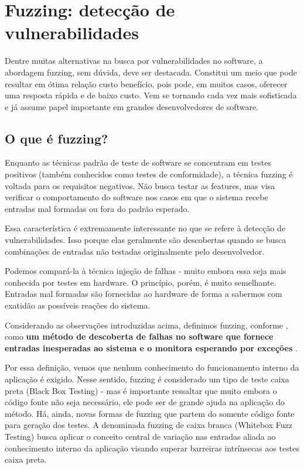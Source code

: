 
\chapter{Fuzzing: detecção de vulnerabilidades}
\label{chap:fuzzing}

	Dentre muitas alternativas na busca por vulnerabilidades no software,
	a abordagem fuzzing, sem dúvida, deve ser destacada.
	Constitui um meio que pode resultar em ótima relação custo benefício,
	pois pode, em muitos casos, oferecer uma resposta rápida e de baixo custo.
	Vem se tornando cada vez mais sofisticada e já assume papel importante
	em grandes desenvolvedores de software.

	\section{O que é fuzzing?}
		Enquanto as técnicas padrão de teste de software se concentram em testes positivos
		(também conhecidos como testes de conformidade), a técnica fuzzing é voltada
		para os requisitos negativos.
		Não busca testar as features, mas visa verificar o comportamento do software nos casos em que
		o sistema recebe entradas mal formadas ou fora do padrão esperado.

		Essa característica é extremamente interessante no que se refere à detecção de vulnerabilidades.
		Isso porque elas geralmente são descobertas quando se busca combinações de entradas não
		testadas originalmente pelo desenvolvedor.

		Podemos compará-la à técnica injeção de falhas - muito embora
		essa seja mais conhecida por testes em hardware. O princípio, porém, é muito semelhante.
		Entradas mal formadas são fornecidas ao hardware de forma a sabermos com exatidão
		as possíveis reações do sistema.		
		
		Considerando as observações introduzidas acima, definimos fuzzing, conforme \cite{Ari2008},
		como {\bf um método de descoberta de falhas no software que fornece entradas inesperadas
		ao sistema e o monitora esperando por exceções} . 

		Por essa definição, vemos que nenhum conhecimento do funcionamento interno da aplicação é exigido.
		Nesse sentido, fuzzing é considerado um tipo de teste caixa preta (Black Box Testing) - mas é importante
		ressaltar que muito embora o código fonte não seja necessário, ele pode ser de grande
		ajuda na aplicação do método. Há, ainda, novas formas de fuzzing que partem do somente código fonte para
		geração dos testes. A denominada fuzzing de caixa branca (Whitebox Fuzz Testing) busca aplicar
		o conceito central de variação nas entradas aliada ao conhecimento interno da aplicação visando
		superar barreiras intrínsecas aos testes caixa preta.

